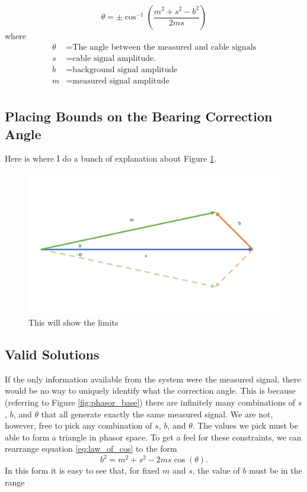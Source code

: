 \documentclass[paper=a4, fontsize=11pt]{scrartcl}
\numberwithin{equation}{section}		%
\numberwithin{figure}{section}			%
\numberwithin{table}{section}				%
\begin{document}
\begin{appendices}
\begin{equation} \label{eq:theta_solution}
\theta = \pm \cos^{-1}\left(\frac{m^2 + s^2 - b^2}{2ms}\right)
\end{equation}
where
\begin{align*}
        \theta &= \text{The angle between the measured and cable signals}\\
        s &= \text{cable signal amplitude.}\\
        b &= \text{background signal amplitude} \\
        m &= \text{measured signal amplitude} \\
\end{align*}


\subsection{Placing Bounds on the Bearing Correction Angle}
Here is where I do a bunch of explanation about Figure \ref{fig:theta_limits}.


\begin{figure}
  \caption{This will show the limits}
  \label{fig:theta_limits}
  \centering
  \includegraphics[width=1.0\textwidth]{figures/phasor_base.pdf}
\end{figure}




\subsection{Valid Solutions} \label{section:validity}
If the only information available from the system were the measured signal, there would be no way to uniquely identify what the correction angle.  This is because (referring to Figure \ref{fig:phasor_base}) there are infinitely many combinations of $s$, $b$, and $\theta$ that all generate exactly the same measured signal. We are not, however, free to pick any combination of $s$, $b$, and $\theta$.  The values we pick must be able to form a triangle in phasor space.  To get a feel for these constraints, we can rearrange equation \ref{eq:law_of_cos} to the form
\begin{equation}
    b^2 = m^2 + s^2 - 2 m s \cos\left(\theta\right).
\end{equation}
In this form it is easy to see that, for fixed $m$ and $s$, the value of $b$ must be in the range


\end{appendices}
\end{document}
